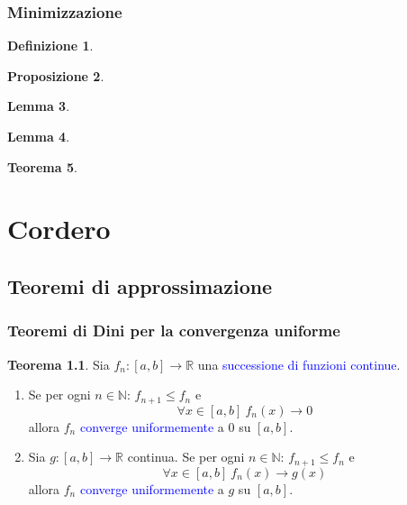 \documentclass[10pt]{book}
\newcommand{\1}{\mathds{1}}
\newcommand{\R}{\mathds{R}}
\newcommand{\N}{\mathds{N}}
\theoremstyle{definition}%
\newtheorem{thm}{Teorema}[section]
\newtheorem{lem}[thm]{Lemma}
\newtheorem{prop}[thm]{Proposizione}
\theoremstyle{plain}
\newtheorem{definizione}[thm]{Definizione}
\theoremstyle{remark}
\renewcommand{\href}[2]{\textcolor{blue}{#2}}
\begin{document}
\section{Minimizzazione}
\label{sec:org983c43a}

\begin{definizione}
\lipsum[1]
\end{definizione}
\begin{prop}
\lipsum[1]
\end{prop}
\begin{lem}
\lipsum[2]
\end{lem}

\begin{lem}
\lipsum[3]
\end{lem}

\begin{thm}
\lipsum[4]
\end{thm}
\part{Cordero}
\chapter{Teoremi di approssimazione}
\label{sec:orgb194d57}

\section{Teoremi di Dini per la convergenza uniforme}
\label{sec:orgb3f9969}
\begin{thm}
Sia \(f_{n}:[a,b]\to \R\) una \href{../../../../../org/roam/20250629105815-successione_di_funzioni.org}{successione di funzioni} \href{../../../../../org/roam/20250103103252-funzione_continua.org}{continue}.
\begin{enumerate}
\item Se per ogni \(n \in \N\): \(f_{n+1}\le f_{n}\) e
\begin{equation*}
 \forall x \in [a,b]\ f_{n}(x)\to 0
\end{equation*}
allora \(f_{n}\) \href{../../../../../org/roam/20250629105745-convergenza_uniforme.org}{converge uniformemente} a \(0\) su \([a,b]\).
\item Sia \(g:[a,b]\to \R\) continua. Se per ogni \(n \in \N\): \(f_{n+1}\le f_{n}\) e
\begin{equation*}
 \forall x \in [a,b]\ f_{n}(x)\to g(x)
\end{equation*}
allora \(f_{n}\) \href{../../../../../org/roam/20250629105745-convergenza_uniforme.org}{converge uniformemente} a \(g\) su \([a,b]\).
\end{enumerate}
\end{thm}
\end{document}
